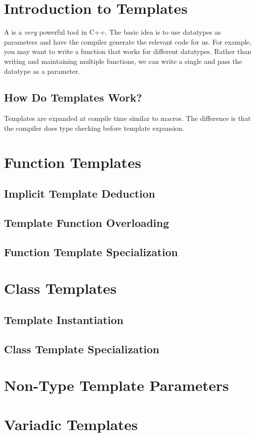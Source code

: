 \documentclass{article}
\title{\thistitle}
\author{\me}
\date{\today}
\begin{document}
\maketitle
\tableofcontents
\pagebreak

\section{Introduction to Templates}

\noindent
A  is a \textit{very} powerful tool in C++. The basic idea is to use datatypes as parameters and have the compiler generate the relevant code for us. For example, you may want to write a function  that works for different datatypes. Rather than writing and maintaining multiple  functions, we can write a single  and pass the datatype as a parameter.

\subsection{How Do Templates Work?}

\noindent
Templates are expanded at compile time similar to macros. The difference is that the compiler does type checking before template expansion.

\section{Function Templates}

\noindent


\subsection{Implicit Template Deduction}

\subsection{Template Function Overloading}

\subsection{Function Template Specialization}

\section{Class Templates}

\subsection{Template Instantiation}

\subsection{Class Template Specialization}

\section{Non-Type Template Parameters}

\section{Variadic Templates}
\end{document}
